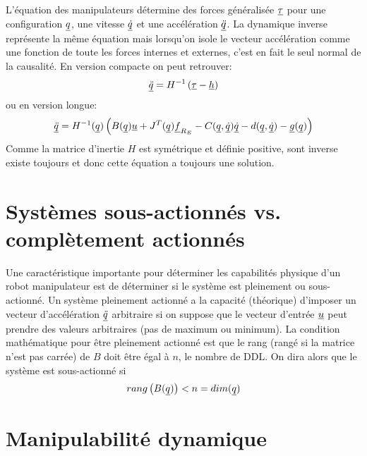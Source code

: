 L'équation des manipulateurs détermine des forces généralisée $\underline{\tau}$ pour une configuration $\underline{q}$, une vitesse $\underline{\dot{q}}$ et une accélération $\underline{\ddot{q}}$. La dynamique inverse représente la même équation mais lorsqu'on isole le vecteur accélération comme une fonction de toute les forces internes et externes, c'est en fait le seul normal de la causalité. En version compacte on peut retrouver:
\begin{align}
\underline{\ddot{q}}  = H^{-1} \left( \underline{\tau} - \underline{h} \right)
\end{align}
ou en version longue:
\begin{align}
\underline{\ddot{q}}  = H^{-1}(\underline{q}) \left( B(\underline{q}) \underline{u}  + J^T(\underline{q}) \underline{f}_{R_E} - C(\underline{q},\underline{\dot{q}}) \underline{\dot{q}} - d(\underline{q}, \underline{\dot{q}}) - \underline{g}(\underline{q})  \right)
\end{align}
Comme la matrice d'inertie $H$ est symétrique et définie positive, sont inverse existe toujours et donc cette équation a toujours une solution.

\section{Systèmes sous-actionnés vs. complètement actionnés}
\label{sec:underactuated}

Une caractéristique importante pour déterminer les capabilités physique d'un robot manipulateur est de déterminer si le système est pleinement ou sous-actionné. Un système pleinement actionné a la capacité (théorique) d'imposer un vecteur d'accélération $\underline{\ddot{q}}$ arbitraire si on suppose que le vecteur d'entrée $\underline{u}$ peut prendre des valeurs arbitraires (pas de maximum ou minimum). La condition mathématique pour être pleinement actionné est que le rang (rangé si la matrice n'est pas carrée) de $B$ doit être égal à $n$, le nombre de DDL. On dira alors que le système est sous-actionné si
\begin{align}
rang\left( B(\underline{q}) \right) < n = dim( \underline{q} )
\end{align}

\section{Manipulabilité dynamique}
\label{sec:dynamicmanipulability}

